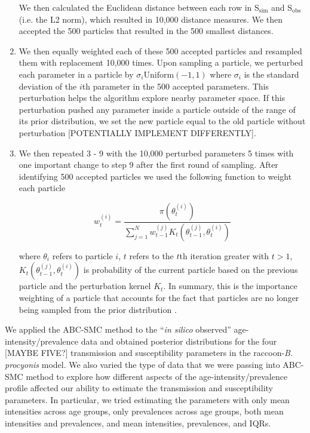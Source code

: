 \documentclass[11pt]{article}
\begin{document}
\begin{enumerate}
  We then calculated the Euclidean distance between each row in S$_\text{sim}$
  and S$_\text{obs}$ (i.e. the L2 norm), which resulted in 10,000 distance
  measures. We then accepted the 500 particles that resulted in the
  500 smallest distances.
\item
  We then equally weighted each of these 500 accepted particles and
  resampled them with replacement 10,000 times. Upon sampling a
  particle, we perturbed each parameter in a particle by
 $\sigma_i \text{Uniform}(-1, 1)$ where $\sigma_i$ is the standard
  deviation of the $i$th parameter in the 500 accepted parameters. This
  perturbation helps the algorithm explore nearby parameter space. If this perturbation pushed any parameter inside a particle outside of the range of its prior distribution, we set the new particle equal to the old particle without perturbation [POTENTIALLY IMPLEMENT DIFFERENTLY].
\item
  We then repeated 3 - 9 with the 10,000 perturbed parameters 5
  times with one important change to step 9 after the first round of
  sampling. After identifying 500 accepted particles we used the
  following function to weight each particle \citep{Toni2009}

  \begin{equation}
    w_t^{(i)} = \dfrac{\pi(\theta_t^{(i)})}{\sum_{j = 1}^N w_{t - 1}^{(j)} K_t(\theta_{t - 1}^{(j)}, \theta_t^{(i)})}
  \end{equation}

  where $\theta_i$ refers to particle $i$, $t$ refers to the $t$th iteration greater with $t > 1$,  $K_t(\theta_{t - 1}^{(j)}, \theta_t^{(i)})$ is probability of the current particle based on the previous particle and the perturbation kernel $K_t$. 
  In summary, this is the
  importance weighting of a particle that accounts for the fact that
  particles are no longer being sampled from the prior distribution \citep{Beaumont2010}.
\end{enumerate}

We applied the ABC-SMC method to the ``\emph{in silico} observed'' age-intensity/prevalence data and obtained posterior distributions for the four [MAYBE FIVE?]
transmission and susceptibility parameters in the raccoon-\emph{B.
procyonis} model.  We also varied the type of data that we were passing into ABC-SMC method to explore how different aspects of the age-intensity/prevalence profile affected our ability to estimate the transmission and susceptibility parameters.  In particular, we tried estimating the parameters with only mean intensities across age groups, only prevalences across age groups, both mean intensities and prevalences, and mean intensities, prevalences, and IQRs. 
\end{document}
